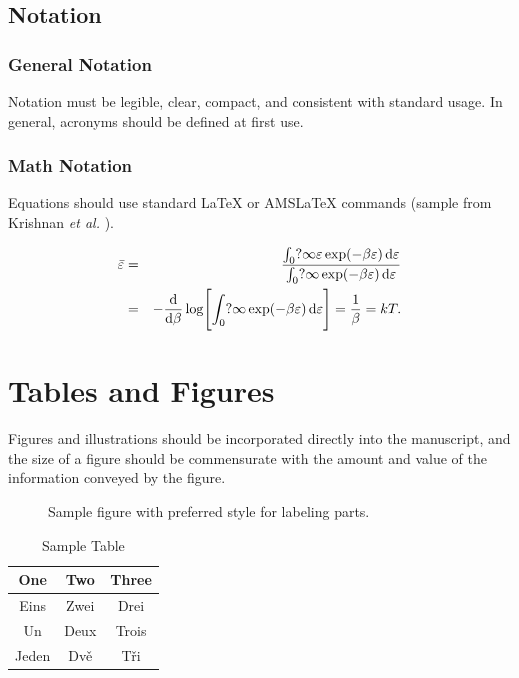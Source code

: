 \documentclass{article}
\begin{document}
\subsection{Notation}
\subsubsection{General Notation}
Notation must be
legible, clear, compact, and consistent with standard usage. In
general, acronyms should be defined at first use.


\subsubsection{Math Notation}
Equations should use standard \LaTeX{} or AMS\LaTeX{} commands (sample from Krishnan \textit{et al.} \cite{krishnan00}).

\begin{eqnarray}
\bar\varepsilon &=& \frac{\int_0?\infty\varepsilon
\exp(-\beta\varepsilon)\,{\rm d}\varepsilon}{\int_0?\infty
\exp(-\beta\varepsilon)\,{\rm d}\varepsilon}\nonumber\\
&=& -\frac{{\rm d}}{{\rm d}\beta}\log\Biggl[\int_0?\infty\exp
(-\beta\varepsilon)\,{\rm d}\varepsilon\Biggr]=\frac1\beta=kT.
\end{eqnarray}

\section{Tables and Figures}
Figures and illustrations should be incorporated directly into the
manuscript, and the size of a figure should be commensurate with the amount
and value of the information conveyed by the figure.

\begin{figure}[htbp]
  \centering
\caption{Sample figure with preferred style for labeling parts.}
\end{figure}


\begin{table}[htb]
 \centering \caption{Sample Table}
\begin{tabular}{ccc}
    \hline
    One & Two & Three \\
    \hline
    Eins & Zwei & Drei \\
    Un & Deux & Trois \\
    Jeden & Dv\v{e} & T\v{r}i \\
    \hline
   \end{tabular}
    \end{table}
\end{document}
